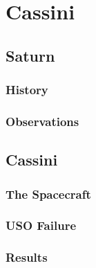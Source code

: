\chapter{Cassini}
    \section{Saturn}
        \subsection{History}
        \subsection{Observations}
    \section{Cassini}
        \subsection{The Spacecraft}
        \subsection{USO Failure}
        \subsection{Results}